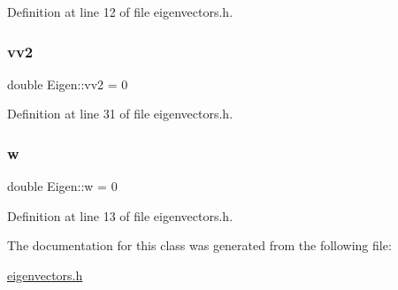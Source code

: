Definition at line 12 of file eigenvectors.\+h.

\mbox{\label{classEigen_adc85510c33dea4d030fbba660fa62aa3}} 
\subsubsection{\texorpdfstring{vv2}{vv2}}
{\footnotesize\ttfamily double Eigen\+::vv2 = 0\hspace{0.3cm}{\ttfamily [private]}}



Definition at line 31 of file eigenvectors.\+h.

\mbox{\label{classEigen_adbbc0e62f3a0cb4a6e0da2722657a524}} 
\subsubsection{\texorpdfstring{w}{w}}
{\footnotesize\ttfamily double Eigen\+::w = 0\hspace{0.3cm}{\ttfamily [private]}}



Definition at line 13 of file eigenvectors.\+h.



The documentation for this class was generated from the following file\+:\begin{DoxyCompactItemize}
\item 
\hyperlink{eigenvectors_8h}{eigenvectors.\+h}\end{DoxyCompactItemize}
